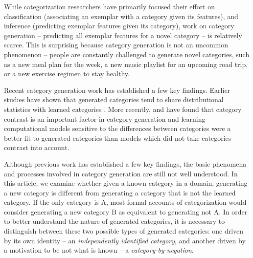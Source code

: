 \documentclass[10pt,letterpaper]{article}
\begin{document}
While categorization researchers have primarily focused their effort on classification (associating an exemplar with a
category given its features), and inference (predicting exemplar features given its category), work on category
generation -- predicting all exemplar features for a novel category -- is relatively scarce. This is surprising because
category generation is not an uncommon phenomenon -- people are constantly challenged to generate novel categories, such
as a new meal plan for the week, a new music playlist for an upcoming road trip, or a new exercise regimen to stay
healthy.

Recent category generation work has established a few key
findings. Earlier studies have shown that generated
categories tend to share distributional statistics with learned categories \citep{ward1994structured,jern2013probabilistic,thomas98}. More recently, 
\cite{austerweil2018catgen} and \cite{conaway2017packer} have found that category contrast is an important factor in category generation and learning -- computational models sensitive to the
differences between categories were a better fit to generated categories than models
which did not take categories contrast into account.

Although previous work has established a few key findings, the basic phenomena and processes involved in category
generation are still not well understood. In this article, we examine whether given a known category in a domain,
generating a new category is different from generating a category that is not the learned category. If the only category
is A, most formal accounts of categorization would consider generating a new category B as equivalent to generating not
A. In order to better understand the nature of generated categories, it is necessary to distinguish between these two
possible types of generated categories: one driven by its own identity -- an \emph{independently identified category},
and another driven by  a motivation to be not what is known -- a
\emph{category-by-negation}.
\end{document}
